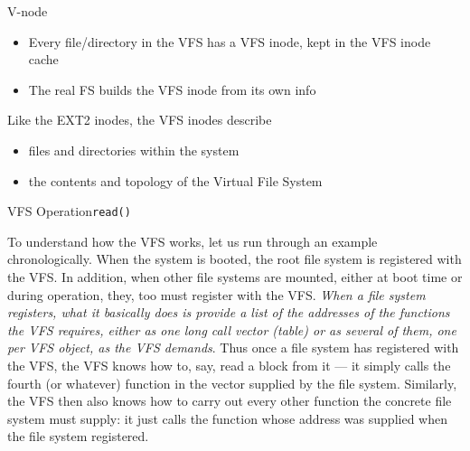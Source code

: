 \begin{frame}{V-node}
  \begin{itemize}
  \item Every file/directory in the VFS has a VFS inode, kept in the VFS \alert{inode
      cache}
  \item The real FS builds the VFS inode from its own info
  \end{itemize}
  \begin{block}{Like the EXT2 inodes, the VFS inodes describe}
    \begin{itemize}
    \item files and directories within the system
    \item the contents and topology of the Virtual File System
    \end{itemize}
  \end{block}
\end{frame}

\begin{frame}{VFS Operation}{\texttt{read()}}
  \label{fig:vfs2}
  \begin{center}
     
  \end{center}
\end{frame}

To understand how the VFS works, let us run through an example chronologically. When the
system is booted, the root file system is registered with the VFS.  In addition, when
other file systems are mounted, either at boot time or during operation, they, too must
register with the VFS. \emph{When a file system registers, what it basically does is provide
  a list of the addresses of the functions the VFS requires, either as one long call
  vector (table) or as several of them, one per VFS object, as the VFS demands}. Thus once
a file system has registered with the VFS, the VFS knows how to, say, read a block from it
--- it simply calls the fourth (or whatever) function in the vector supplied by the file
system. Similarly, the VFS then also knows how to carry out every other function the
concrete file system must supply: it just calls the function whose address was supplied
when the file system registered.

